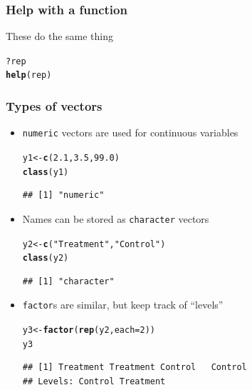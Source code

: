 \documentclass[color=usenames,dvipsnames]{beamer}\usepackage[]{graphicx}\usepackage[]{color}
\makeatletter
\newcommand{\hlnum}[1]{\textcolor[rgb]{0.686,0.059,0.569}{#1}}%
\newcommand{\hlstr}[1]{\textcolor[rgb]{0.192,0.494,0.8}{#1}}%
\newcommand{\hlopt}[1]{\textcolor[rgb]{0,0,0}{#1}}%
\newcommand{\hlstd}[1]{\textcolor[rgb]{0.345,0.345,0.345}{#1}}%
\newcommand{\hlkwb}[1]{\textcolor[rgb]{0.69,0.353,0.396}{#1}}%
\newcommand{\hlkwc}[1]{\textcolor[rgb]{0.333,0.667,0.333}{#1}}%
\newcommand{\hlkwd}[1]{\textcolor[rgb]{0.737,0.353,0.396}{\textbf{#1}}}%
\newenvironment{kframe}{%
 \def\at@end@of@kframe{}%
 \ifinner\ifhmode%
  \def\at@end@of@kframe{\end{minipage}}%
  \begin{minipage}{\columnwidth}%
 \fi\fi%
 \def\FrameCommand##1{\hskip\@totalleftmargin \hskip-\fboxsep
 \colorbox{shadecolor}{##1}\hskip-\fboxsep
     \hskip-\linewidth \hskip-\@totalleftmargin \hskip\columnwidth}%
 \MakeFramed {\advance\hsize-\width
   \@totalleftmargin\z@ \linewidth\hsize
   \@setminipage}}%
 {\par\unskip\endMakeFramed%
 \at@end@of@kframe}
\newenvironment{knitrout}{}{} %
\makeatother
\begin{document}
\begin{frame}[fragile]
  \frametitle{Help with a function}
\LARGE
These do the same thing
\begin{knitrout}
\color{fgcolor}\begin{kframe}
\begin{alltt}
\hlopt{?}\hlstd{rep}
\hlkwd{help}\hlstd{(rep)}
\end{alltt}
\end{kframe}
\end{knitrout}
\end{frame}




\begin{frame}[fragile]
  \frametitle{Types of vectors}
  \begin{itemize}[<+->]
  \item \verb+numeric+ vectors are used for continuous variables
\begin{knitrout}
\color{fgcolor}\begin{kframe}
\begin{alltt}
\hlstd{y1} \hlkwb{<-} \hlkwd{c}\hlstd{(}\hlnum{2.1}\hlstd{,} \hlnum{3.5}\hlstd{,} \hlnum{99.0}\hlstd{)}
\hlkwd{class}\hlstd{(y1)}
\end{alltt}
\begin{verbatim}
## [1] "numeric"
\end{verbatim}
\end{kframe}
\end{knitrout}
  \item Names can be stored as \verb+character+ vectors
\begin{knitrout}
\color{fgcolor}\begin{kframe}
\begin{alltt}
\hlstd{y2} \hlkwb{<-} \hlkwd{c}\hlstd{(}\hlstr{"Treatment"}\hlstd{,} \hlstr{"Control"}\hlstd{)}
\hlkwd{class}\hlstd{(y2)}
\end{alltt}
\begin{verbatim}
## [1] "character"
\end{verbatim}
\end{kframe}
\end{knitrout}
  \item \verb+factor+s are similar, but keep track of ``levels''
\begin{knitrout}
\color{fgcolor}\begin{kframe}
\begin{alltt}
\hlstd{y3} \hlkwb{<-} \hlkwd{factor}\hlstd{(}\hlkwd{rep}\hlstd{(y2,} \hlkwc{each}\hlstd{=}\hlnum{2}\hlstd{))}
\hlstd{y3}
\end{alltt}
\begin{verbatim}
## [1] Treatment Treatment Control   Control  
## Levels: Control Treatment
\end{verbatim}
\end{kframe}
\end{knitrout}
  \end{itemize}
\end{frame}
\end{document}

